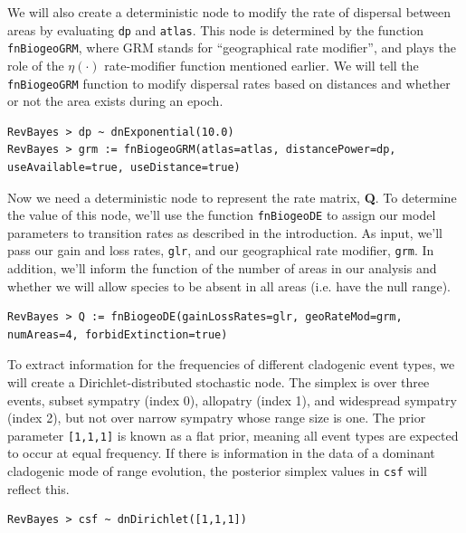 \documentclass[11pt]{article}
\begin{document}
We will also create a deterministic node to modify the rate of dispersal between areas by evaluating {\tt dp} and {\tt atlas}.
This node is determined by the function {\tt fnBiogeoGRM}, where GRM stands for ``geographical rate modifier'', and plays the role of the $\eta(\cdot)$ rate-modifier function mentioned earlier.
We will tell the {\tt fnBiogeoGRM} function to modify dispersal rates based on distances and whether or not the area exists during an epoch.

\begin{snugshade}
\begin{lstlisting}
RevBayes > dp ~ dnExponential(10.0)
RevBayes > grm := fnBiogeoGRM(atlas=atlas, distancePower=dp, useAvailable=true, useDistance=true)
\end{lstlisting}
\end{snugshade}

Now we need a deterministic node to represent the rate matrix, {\bf Q}.
To determine the value of this node, we'll use the function {\tt fnBiogeoDE} to assign our model parameters to transition rates as described in the introduction.
As input, we'll pass our gain and loss rates, {\tt glr}, and our geographical rate modifier, {\tt grm}.
In addition, we'll inform the function of the number of areas in our analysis and whether we will allow species to be absent in all areas (i.e. have the null range).

\begin{snugshade}
\begin{lstlisting}
RevBayes > Q := fnBiogeoDE(gainLossRates=glr, geoRateMod=grm, numAreas=4, forbidExtinction=true)
\end{lstlisting}
\end{snugshade}

To extract information for the frequencies of different cladogenic event types, we will create a Dirichlet-distributed stochastic node.
The simplex is over three events, subset sympatry (index 0), allopatry (index 1), and widespread sympatry (index 2), but not over narrow sympatry whose range size is one.
The prior parameter {\tt [1,1,1]} is known as a flat prior, meaning all event types are expected to occur at equal frequency.
If there is information in the data of a dominant cladogenic mode of range evolution, the posterior simplex values in {\tt csf} will reflect this.

\begin{snugshade}
\begin{lstlisting}
RevBayes > csf ~ dnDirichlet([1,1,1])
\end{lstlisting}
\end{snugshade}
\end{document}
